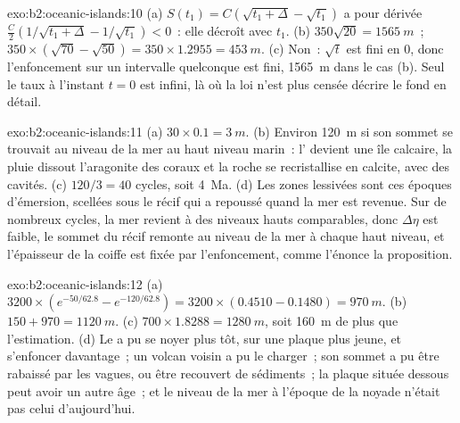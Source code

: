 \begin{solution}{exo:b2:oceanic-islands:10}
(a) $S(t_1) = C(\sqrt{t_1 + \Delta} - \sqrt{t_1})$ a pour dérivée $\frac C2(1/\sqrt{t_1 +
\Delta} - 1/\sqrt{t_1}) < 0$~: elle décroît avec $t_1$. (b) $350\sqrt{20} = \qty{1565}{m}$~; $350\times
(\sqrt{70} - \sqrt{50}) = 350\times1.2955 = \qty{453}{m}$. (c) Non~: $\sqrt t$ est fini en $0$, donc
l'enfoncement sur un intervalle quelconque est fini, \qty{1565}{m} dans le cas (b). Seul le taux à l'instant $t = 0$
est infini, là où la loi n'est plus censée décrire le fond en détail.
\end{solution}

\begin{solution}{exo:b2:oceanic-islands:11}
(a) $30\times0.1 = \qty{3}{m}$. (b) Environ \qty{120}{m} si son sommet se trouvait au niveau de
la mer au haut niveau marin~: l' devient une île calcaire, la pluie dissout l'aragonite des
coraux et la roche se recristallise en calcite, avec des cavités. (c) $120/3 = 40$ cycles, soit
\qty{4}{Ma}. (d) Les zones lessivées sont ces époques d'émersion, scellées sous le récif qui
a repoussé quand la mer est revenue. Sur de nombreux cycles, la mer revient à des niveaux hauts
comparables, donc $\Delta\eta$ est faible, le sommet du récif remonte au niveau de la mer à chaque
haut niveau, et l'épaisseur de la coiffe est fixée par l'enfoncement, comme l'énonce la proposition.
\end{solution}

\begin{solution}{exo:b2:oceanic-islands:12}
(a) $3200\times(e^{-50/62.8} - e^{-120/62.8}) = 3200\times(0.4510 - 0.1480) = \qty{970}{m}$.
(b) $150 + 970 = \qty{1120}{m}$. (c) $700\times1.8288 = \qty{1280}{m}$, soit \qty{160}{m}
de plus que l'estimation. (d) Le  a pu se noyer plus tôt, sur une plaque plus jeune,
et s'enfoncer davantage~; un volcan voisin a pu le charger~; son sommet a pu être rabaissé
par les vagues, ou être recouvert de sédiments~; la plaque située dessous peut avoir un
autre âge~; et le niveau de la mer à l'époque de la noyade n'était pas celui d'aujourd'hui.
\end{solution}

